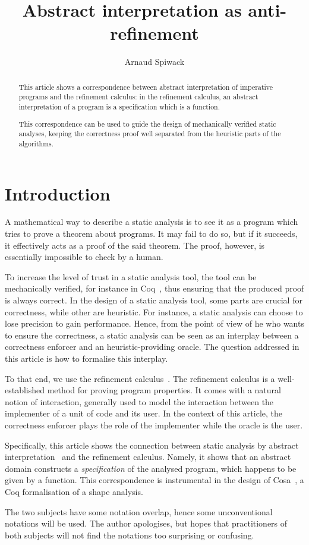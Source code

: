 \documentclass[]{llncs}
\title{Abstract interpretation as anti-refinement}
\author{Arnaud Spiwack}
\institute{Inria Paris-Rocquencourt\\\textsc{Ens}, 45 rue d'Ulm, 75230 Paris Cedex 05, France\\
\email{arnaud@spiwack.net}}
\begin{document}
  \maketitle
\begin{abstract}
    This article shows a correspondence between abstract interpretation of imperative programs and the refinement calculus: in the refinement calculus, an abstract interpretation of a program is a specification which is a function.
\par
This correspondence can be used to guide the design of mechanically verified static analyses, keeping the correctness proof well separated from the heuristic parts of the algorithms.
  \end{abstract}
\section{Introduction}
  A mathematical way to describe a static analysis is to see it as a program which tries to prove a theorem about programs. It may fail to do so, but if it succeeds, it effectively acts as a proof of the said theorem. The proof, however, is essentially impossible to check by a human.
\par
To increase the level of trust in a static analysis tool, the tool can be mechanically verified, for instance in Coq~\cite{coq}, thus ensuring that the produced proof is always correct. In the design of a static analysis tool, some parts are crucial for correctness, while other are heuristic. For instance, a static analysis can choose to lose precision to gain performance. Hence, from the point of view of he who wants to ensure the correctness, a static analysis can be seen as an interplay between a correctness enforcer and an heuristic-providing oracle. The question addressed in this article is how to formalise this interplay.
\par
To that end, we use the refinement calculus~\cite{Back1998,VonWright1994}. The refinement calculus is a well-established method for proving program properties. It comes with a natural notion of interaction, generally used to model the interaction between the implementer of a unit of code and its user. In the context of this article, the correctness enforcer plays the role of the implementer while the oracle is the user.
\par
Specifically, this article shows the connection between static analysis by abstract interpretation~\cite{Cousot1992} and the refinement calculus. Namely, it shows that an abstract domain constructs a \emph{specification} of the analysed program, which happens to be given by a function. This correspondence is instrumental in the design of Cosa~\cite{cosa}, a Coq formalisation of a shape analysis.
\par
The two subjects have some notation overlap, hence some unconventional notations will be used. The author apologises, but hopes that practitioners of both subjects will not find the notations too surprising or confusing.
\end{document}
